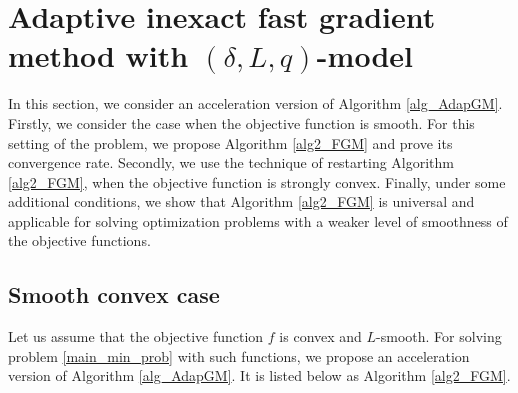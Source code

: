 \documentclass[11pt]{amsart}
\theoremstyle{definition}
\numberwithin{equation}{section}
\begin{document}
\section{Adaptive inexact fast gradient method with $(\delta, L, q)$-model}\label{sec:FGM}

In this section, we consider an acceleration version of Algorithm \ref{alg_AdapGM}. Firstly, we consider the case when the objective function is smooth. For this setting of the problem, we propose  Algorithm \ref{alg2_FGM} and prove its convergence rate. Secondly, we use the technique of restarting Algorithm \ref{alg2_FGM}, when the objective function is strongly convex. Finally, under some additional conditions, we show that Algorithm \ref{alg2_FGM} is universal and applicable for solving optimization problems with a weaker level of smoothness of the objective functions. 

\subsection{Smooth convex case}

Let us assume that the objective function $f$ is convex and $L$-smooth. For solving problem \eqref{main_min_prob} with such functions, we propose an acceleration version of Algorithm \ref{alg_AdapGM}. It is listed below as Algorithm \ref{alg2_FGM}.
\end{document}

